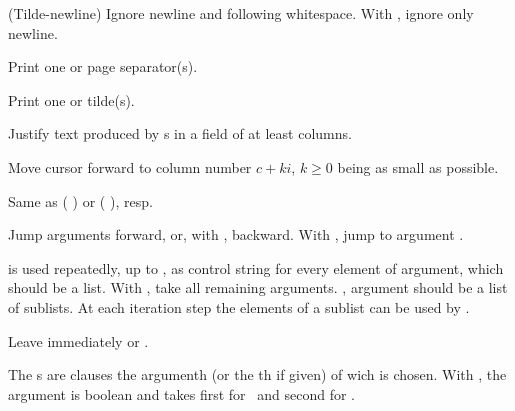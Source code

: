 \begin{LIST}{1cm}
\begin{LIST}{.5cm}
    {
    (Tilde-newline) Ignore newline and following
    whitespace. With , ignore only newline.
  }

    {
    Print one or  page separator(s).
  }

    {
    Print one or  tilde(s).
  }

    {
    Justify text produced by s in a field of at least
     columns.
  }

    {
    Move cursor forward to column number $c + ki$, $k \geq 0$ being as small
    as possible.
  }

    {
    Same as (  ) or
    (  ), resp.
  }

    {
    Jump  arguments forward, or, with \kwd{:}, backward. With
    , jump to argument .
  }

    {
     is used repeatedly, up to , as control
    string for every element of argument, which should be a list. With
    , take all remaining arguments. \kwd{:}, argument should be
    a list of sublists. At each iteration step the elements of a
    sublist can be used by . 
  }

    \IT{\KWD{\TLD\^{}}}
    {
    Leave immediately \kwd{\TLD\boldmath{$<$}} or \kwd{\TLD\boldmath{$\{$}}.
  }

    {
    The s are clauses the argumenth (or the th if given) of wich is chosen. With
    \kwd{:}, the argument is boolean and takes first  for \NIL\ and
    second  for \T.
  }


\end{LIST}
\end{LIST}
